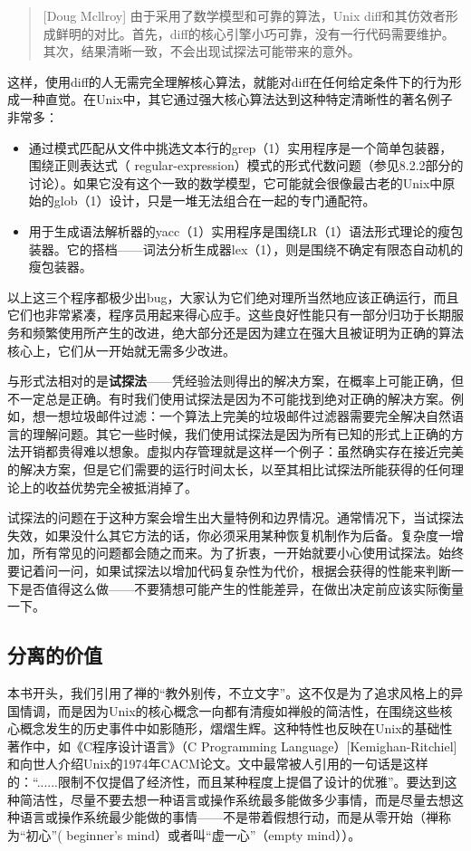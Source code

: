 \documentclass[12pt,oneside]{book}
\begin{document}
\begin{common-format}
\begin{quote}[Doug Mcllroy]
由于采用了数学模型和可靠的算法，Unix diff和其仿效者形成鲜明的对比。首先，diff的核心引擎小巧可靠，没有一行代码需要维护。其次，结果清晰一致，不会出现试探法可能带来的意外。
\end{quote}

这样，使用diff的人无需完全理解核心算法，就能对diff在任何给定条件下的行为形成一种直觉。在Unix中，其它通过强大核心算法达到这种特定清晰性的著名例子非常多：

\begin{itemize}
\item 通过模式匹配从文件中挑选文本行的grep（1）实用程序是一个简单包装器，围绕正则表达式（ regular-expression）模式的形式代数问题（参见8.2.2部分的讨论）。如果它没有这个一致的数学模型，它可能就会很像最古老的Unix中原始的glob（1）设计，只是一堆无法组合在一起的专门通配符。
\item 用于生成语法解析器的yacc（1）实用程序是围绕LR（1）语法形式理论的瘦包装器。它的搭档——词法分析生成器lex（1），则是围绕不确定有限态自动机的瘦包装器。
\end{itemize}

以上这三个程序都极少出bug，大家认为它们绝对理所当然地应该正确运行，而且它们也非常紧凑，程序员用起来得心应手。这些良好性能只有一部分归功于长期服务和频繁使用所产生的改进，绝大部分还是因为建立在强大且被证明为正确的算法核心上，它们从一开始就无需多少改进。

与形式法相对的是\textbf{试探法}——凭经验法则得出的解决方案，在概率上可能正确，但不一定总是正确。有时我们使用试探法是因为不可能找到绝对正确的解决方案。例如，想一想垃圾邮件过滤：一个算法上完美的垃圾邮件过滤器需要完全解决自然语言的理解问题。其它一些时候，我们使用试探法是因为所有已知的形式上正确的方法开销都贵得难以想象。虚拟内存管理就是这样一个例子：虽然确实存在接近完美的解决方案，但是它们需要的运行时间太长，以至其相比试探法所能获得的任何理论上的收益优势完全被抵消掉了。

试探法的问题在于这种方案会增生出大量特例和边界情况。通常情况下，当试探法失效，如果没什么其它方法的话，你必须采用某种恢复机制作为后备。复杂度一增加，所有常见的问题都会随之而来。为了折衷，一开始就要小心使用试探法。始终要记着问一问，如果试探法以增加代码复杂性为代价，根据会获得的性能来判断一下是否值得这么做——不要猜想可能产生的性能差异，在做出决定前应该实际衡量一下。

\subsection{分离的价值}
本书开头，我们引用了禅的“教外别传，不立文字”。这不仅是为了追求风格上的异国情调，而是因为Unix的核心概念一向都有清瘦如禅般的简洁性，在围绕这些核心概念发生的历史事件中如影随形，熠熠生辉。这种特性也反映在Unix的基础性著作中，如《C程序设计语言》（C Programming Language）[Kemighan-Ritchiel]和向世人介绍Unix的1974年CACM论文。文中最常被人引用的一句话是这样的：“......限制不仅提倡了经济性，而且某种程度上提倡了设计的优雅”。要达到这种简洁性，尽量不要去想一种语言或操作系统最多能做多少事情，而是尽量去想这种语言或操作系统最少能做的事情——不是带着假想行动，而是从零开始（禅称为“初心”( beginner's mind）或者叫“虚一心”（empty mind））。


\end{common-format}
\end{document}

